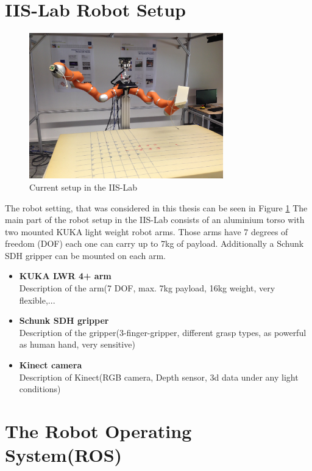 \section{IIS-Lab Robot Setup}
\begin{figure}[ht]
	\centering
  \includegraphics[width=0.75\textwidth]{images/robot_setup.jpg}
	\caption{Current setup in the IIS-Lab}
	\label{fig:iis_setup}
\end{figure}

The robot setting, that was considered in this thesis can be seen in Figure \ref{fig:iis_setup}
The main part of the robot setup in the IIS-Lab consists of an aluminium torso with two mounted KUKA light weight robot arms. Those arms have 7 degrees of freedom (DOF) each one can carry up to 7kg of payload. Additionally a Schunk SDH gripper can be mounted on each arm.

\begin{itemize}
	\item \textbf{KUKA LWR 4+ arm}\\
		Description of the arm(7 DOF, max. 7kg payload, 16kg weight, very flexible,...
	\item \textbf{Schunk SDH gripper}\\
		Description of the gripper(3-finger-gripper, different grasp types, as powerful as human hand, very sensitive)
	\item \textbf{Kinect camera}\\
		Description of Kinect(RGB camera, Depth sensor, 3d data under any light conditions)
\end{itemize}


\section{The Robot Operating System(ROS)}

